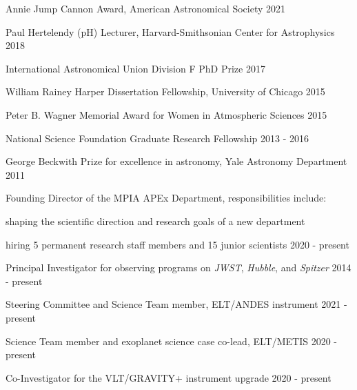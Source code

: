 \documentclass[12pt,letterpaper]{article}
\begin{document}

\begin{list}{}{\cvlist}
\item Annie Jump Cannon Award, American Astronomical Society \hfill 2021
\item Paul Hertelendy (pH) Lecturer, Harvard-Smithsonian Center for Astrophysics \hfill 2018 
\item International Astronomical Union Division F PhD Prize \hfill 2017
\item William Rainey Harper Dissertation Fellowship, University of Chicago \hfill 2015
\item Peter B. Wagner Memorial Award for Women in Atmospheric Sciences \hfill 2015
\item National Science Foundation Graduate Research Fellowship \hfill 2013 - 2016
\item George Beckwith Prize for excellence in astronomy, Yale Astronomy Department \hfill2011

\end{list}


\begin{list}{}{\cvlist}
\item Founding Director of the MPIA APEx Department, responsibilities include:
    \begin{sloppypar}
        \begin{compactitem}
        \item shaping the scientific direction and research goals of a new department
        \item hiring 5 permanent research staff members and 15 junior scientists \hfill 2020 - present
        \end{compactitem}
    \end{sloppypar}
\item Principal Investigator for observing programs on \emph{JWST}, \emph{Hubble}, and \emph{Spitzer} \hfill 2014 - present
\item Steering Committee and Science Team member, ELT/ANDES instrument \hfill 2021 - present
\item Science Team member and exoplanet science case co-lead, ELT/METIS \hfill 2020 - present
\item Co-Investigator for the VLT/GRAVITY+ instrument upgrade \hfill 2020 - present
\end{list}
\end{document}
